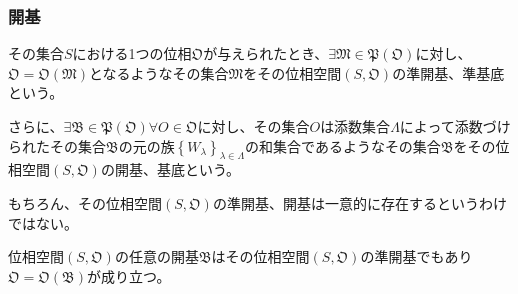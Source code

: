 \documentclass[dvipdfmx]{jsarticle}
\begin{document}
\subsubsection{開基}%
\begin{dfn}
その集合$S$における1つの位相$\mathfrak{O}$が与えられたとき、$\mathfrak{\exists M \in P}\left( \mathfrak{O} \right)$に対し、$\mathfrak{O} = \mathfrak{O}\left( \mathfrak{M} \right)$となるようなその集合$\mathfrak{M}$をその位相空間$\left( S,\mathfrak{O} \right)$の準開基、準基底という。\par
さらに、$\mathfrak{\exists B \in P}\left( \mathfrak{O} \right)\forall O \in \mathfrak{O}$に対し、その集合$O$は添数集合$\varLambda$によって添数づけられたその集合$\mathfrak{B}$の元の族$\left\{ W_{\lambda} \right\}_{\lambda \in \varLambda}$の和集合であるようなその集合$\mathfrak{B}$をその位相空間$\left( S,\mathfrak{O} \right)$の開基、基底という。
\end{dfn}\par
もちろん、その位相空間$\left( S,\mathfrak{O} \right)$の準開基、開基は一意的に存在するというわけではない。
\begin{thm}\label{8.1.2.6}
位相空間$\left( S,\mathfrak{O} \right)$の任意の開基$\mathfrak{B}$はその位相空間$\left( S,\mathfrak{O} \right)$の準開基でもあり$\mathfrak{O} = \mathfrak{O}\left( \mathfrak{B} \right)$が成り立つ。
\end{thm}
\end{document}
